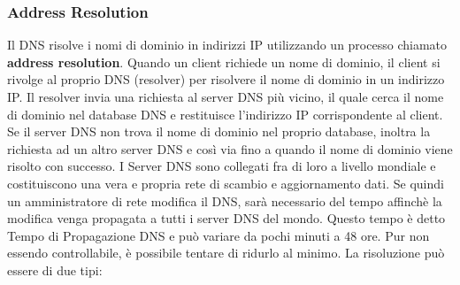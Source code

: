 \documentclass[12pt]{report}
\begin{document}
	\subsubsection{Address Resolution}
	Il DNS risolve i nomi di dominio in indirizzi IP utilizzando un processo chiamato \textbf{address resolution}. Quando un client richiede un nome di dominio, il client si rivolge al proprio DNS (resolver) per risolvere il nome di dominio in un indirizzo IP. Il resolver invia una richiesta al server DNS più vicino, il quale cerca il nome di dominio nel database DNS e restituisce l'indirizzo IP corrispondente al client. Se il server DNS non trova il nome di dominio nel proprio database, inoltra la richiesta ad un altro server DNS e così via fino a quando il nome di dominio viene risolto con successo. I Server DNS sono collegati fra di loro a livello mondiale e costituiscono una vera e propria rete di scambio e aggiornamento dati. Se quindi un amministratore di rete modifica il DNS, sarà necessario del tempo affinchè la modifica venga propagata a tutti i server DNS del mondo. Questo tempo è detto Tempo di Propagazione DNS e può variare da pochi minuti a 48 ore. Pur non essendo controllabile, è possibile tentare di ridurlo al minimo. La risoluzione può essere di due tipi:
\end{document}
